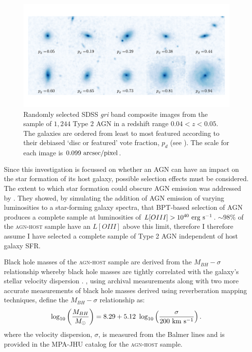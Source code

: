 \begin{figure}
\includegraphics[width=\textwidth]{agn/fig1.pdf}
\caption[SDSS images of galaxies in the \textsc{agn-host} sample]{Randomly selected SDSS \emph{gri} band composite images from the sample of $1,244$ Type 2 AGN in a redshift range $0.04 < z < 0.05$.  The galaxies are ordered from least to most featured according to their debiased `disc or featured' vote fraction, $p_d$ (see \citealt{GZ2}). The scale for each image is $0.099~\rm{arcsec/pixel}$.}
\label{mosaic}
\end{figure}

Since this investigation is focussed on whether an AGN can have an impact on the star formation of its host galaxy, possible selection effects must be considered. The extent to which star formation could obscure AGN emission was addressed by \cite{schawinski10a}. They showed, by simulating the addition of AGN emission of varying luminosities to a star-forming galaxy spectra, that BPT-based selection of AGN produces a complete sample at luminosities of $L[OIII] > 10^{40}~\rm{erg~s}^{-1}$. $\sim98\%$ of the \textsc{agn-host} sample have an $L[OIII]$ above this limit, therefore I therefore assume I have selected a complete sample of Type 2 AGN independent of host galaxy SFR. 

Black hole masses of the \textsc{agn-host} sample are derived from the $M_{BH}-\sigma$ relationship whereby black hole masses are tightly correlated with the galaxy's stellar velocity dispersion \citep{magorrian98, marconi03, haringrix04}. \citet{mcconnell11}, using archival measurements along with two more accurate measurements of black hole masses derived using reverberation mapping techniques, define the $M_{BH}-\sigma$ relationship as:
\begin{equation}
\log_{10}\left(\frac{M_{BH}}{M_{\odot}}\right) = 8.29 + 5.12 ~\log_{10}\left(\frac{\sigma}{200 ~\rm{km} ~s^{-1}}\right). 
\end{equation}
where the velocity dispersion, $\sigma$, is measured from the Balmer lines and is provided in the MPA-JHU catalog \citep{kauffmann03, brinchmann04} for the \textsc{agn-host} sample.

